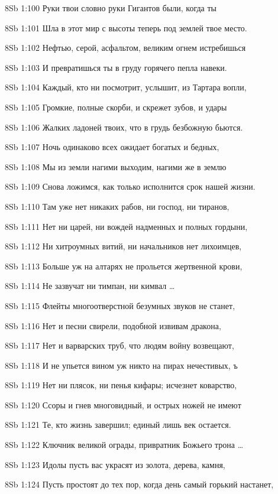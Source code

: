 \vs 8Sb 1:100 Руки твои словно руки Гигантов были, когда ты

\vs 8Sb 1:101 Шла в этот мир с высоты  теперь под землей твое место. 

\vs 8Sb 1:102 Нефтью, серой, асфальтом, великим огнем истребишься 

\vs 8Sb 1:103 И превратишься ты в груду горячего пепла навеки. 

\vs 8Sb 1:104 Каждый, кто ни посмотрит, услышит, из Тартара вопли,

\vs 8Sb 1:105 Громкие, полные скорби, и скрежет зубов, и удары 

\vs 8Sb 1:106 Жалких ладоней твоих, что в грудь безбожную бьются.

\vs 8Sb 1:107 Ночь одинаково всех ожидает  богатых и бедных, 

\vs 8Sb 1:108 Мы из земли нагими выходим, нагими же в землю 

\vs 8Sb 1:109 Снова ложимся, как только исполнится срок нашей жизни.

\vs 8Sb 1:110 Там уже нет никаких рабов, ни господ, ни тиранов, 

\vs 8Sb 1:111 Нет ни царей, ни вождей надменных и полных гордыни, 

\vs 8Sb 1:112 Ни хитроумных витий, ни начальников нет лихоимцев, 

\vs 8Sb 1:113 Больше уж на алтарях не прольется жертвенной крови, 

\vs 8Sb 1:114 Не зазвучат ни тимпан, ни кимвал \ldots

\vs 8Sb 1:115 Флейты многоотверстной безумных звуков не станет, 

\vs 8Sb 1:116 Нет и песни свирели, подобной извивам дракона, 

\vs 8Sb 1:117 Нет и варварских труб, что людям войну возвещают, 

\vs 8Sb 1:118 И не упьется вином уж никто на пирах нечестивых, ъ

\vs 8Sb 1:119 Нет ни плясок, ни пенья кифары; исчезнет коварство,

\vs 8Sb 1:120 Ссоры и гнев многовидный, и острых ножей не имеют 

\vs 8Sb 1:121 Те, кто жизнь завершил; единый лишь век остается. 

\vs 8Sb 1:122 Ключник великой ограды, привратник Божьего трона \ldots

\vs 8Sb 1:123 Идолы пусть вас украсят из золота, дерева, камня, 

\vs 8Sb 1:124 Пусть простоят до тех пор, когда день самый горький настанет,

